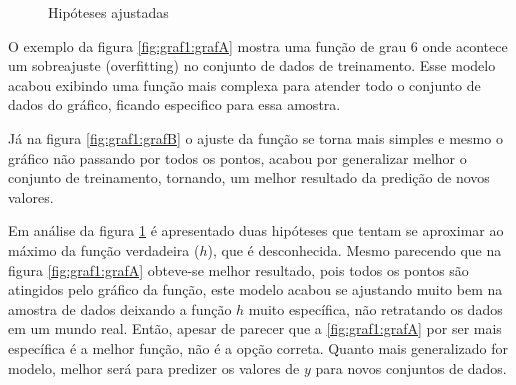  \begin{figure}[h!]
    \centering
    \quad
    
    \caption{Hipóteses ajustadas} \label{fig:graf1}
        
\end{figure}


O exemplo da figura \ref{fig:graf1:grafA} mostra uma função de grau 6 onde acontece  um sobreajuste (overfitting) no conjunto de dados de treinamento. Esse modelo acabou exibindo uma função mais complexa para atender todo o conjunto de dados do gráfico, ficando especifico para essa amostra. 

Já na figura \ref{fig:graf1:grafB} o ajuste da função se torna mais simples e mesmo o gráfico não passando por todos os pontos, acabou por generalizar melhor o conjunto de treinamento, tornando, um melhor resultado da predição de novos valores. 

Em análise da figura \ref{fig:graf1} é apresentado duas hipóteses que tentam se aproximar ao máximo da função verdadeira (${h}$), que é desconhecida. Mesmo parecendo que  na figura \ref{fig:graf1:grafA} obteve-se melhor resultado, pois todos os pontos são atingidos pelo gráfico da função, este modelo acabou se ajustando muito bem na amostra de dados deixando a função ${h}$ muito específica, não retratando os dados em um mundo real. Então, apesar de parecer que a \ref{fig:graf1:grafA} por ser mais específica é a melhor função, não é a opção correta. Quanto mais  generalizado for modelo, melhor será para predizer os valores de ${y}$ para novos conjuntos de dados.

